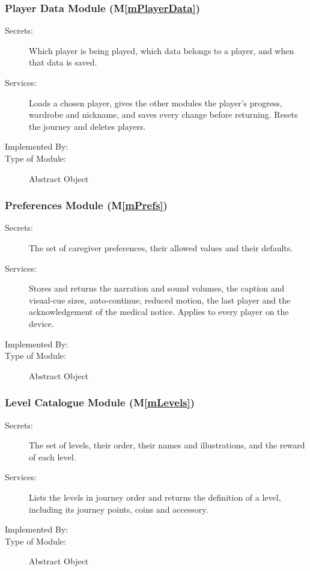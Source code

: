 \documentclass[10pt, titlepage]{article}
\newcommand{\mplainref}[1]{M\ref*{#1}}
\begin{document}
\subsubsection{Player Data Module (\mplainref{mPlayerData})}\label{md:mPlayerData}

\begin{description}
\item[Secrets:] Which player is being played, which data belongs to a player,
  and when that data is saved.
\item[Services:] Loads a chosen player, gives the other modules the player's
  progress, wardrobe and nickname, and saves every change before returning.
  Resets the journey and deletes players.
\item[Implemented By:] \progname{}
\item[Type of Module:] Abstract Object
\end{description}

\subsubsection{Preferences Module (\mplainref{mPrefs})}\label{md:mPrefs}

\begin{description}
\item[Secrets:] The set of caregiver preferences, their allowed values and
  their defaults.
\item[Services:] Stores and returns the narration and sound volumes,
  the caption and visual-cue sizes, auto-continue, reduced motion, the
  last player and the acknowledgement of the medical notice. Applies to every
  player on the device.
\item[Implemented By:] \progname{}
\item[Type of Module:] Abstract Object
\end{description}

\subsubsection{Level Catalogue Module (\mplainref{mLevels})}\label{md:mLevels}

\begin{description}
\item[Secrets:] The set of levels, their order, their names and illustrations,
  and the reward of each level.
\item[Services:] Lists the levels in journey order and returns the definition
  of a level, including its journey points, coins and accessory.
\item[Implemented By:] \progname{}
\item[Type of Module:] Abstract Object
\end{description}
\end{document}
